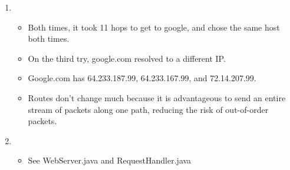 \documentclass[10pt,letterpaper,titlepage]{article}
\begin{document}
\begin{enumerate}
\item \begin{itemize}
  \item Both times, it took 11 hops to get to google, and chose the same host both times.
  \item On the third try, google.com resolved to a different IP.
  \item Google.com has 64.233.187.99, 64.233.167.99, and 72.14.207.99.
  \item Routes don't change much because it is advantageous to send an entire stream of packets along one path, reducing the risk of out-of-order packets.
\end{itemize}
\item \begin{itemize}
  \item See WebServer.java and RequestHandler.java
\end{itemize}
\end{enumerate}
\end{document}
